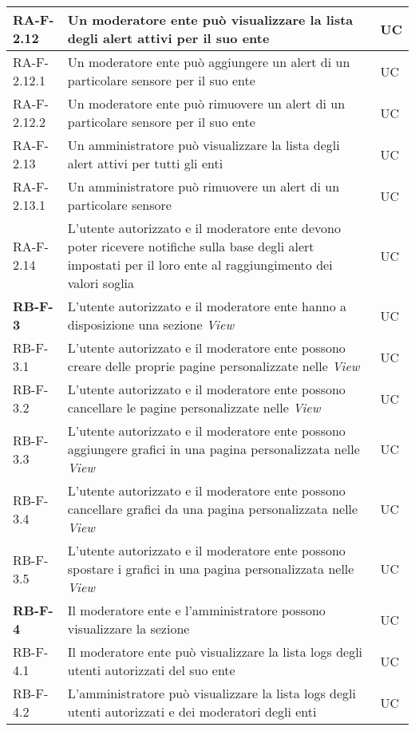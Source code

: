\begin{center}
\begin{longtable}{|p{3cm}|p{9.85cm}|p{2cm}|}
		{\color{gray} RA-F-}2.12 & Un moderatore ente può visualizzare la lista degli alert attivi per il suo ente & UC \\ \hline
		{\color{gray} RA-F-}2.12.1 & Un moderatore ente può aggiungere un alert di un particolare sensore per il suo ente & UC \\ \hline
		{\color{gray} RA-F-}2.12.2 & Un moderatore ente può rimuovere un alert di un particolare sensore per il suo ente & UC \\ \hline
		{\color{gray} RA-F-}2.13 & Un amministratore può visualizzare la lista degli alert attivi per tutti gli enti & UC \\ \hline
		{\color{gray} RA-F-}2.13.1 & Un amministratore può rimuovere un alert di un particolare sensore & UC \\ \hline
		{\color{gray} RA-F-}2.14 & L'utente autorizzato e il moderatore ente devono poter ricevere notifiche sulla base degli alert impostati per il loro ente al raggiungimento dei valori soglia & UC \\ \hline

		\rowcolor{redroundrobin}
		\textbf{RB-F-3} & L'utente autorizzato e il moderatore ente hanno a disposizione una sezione \textit{View} & UC \\ \hline
		{\color{gray} RB-F-}3.1 & L'utente autorizzato e il moderatore ente possono creare delle proprie pagine personalizzate nelle \textit{View} & UC \\ \hline
		{\color{gray} RB-F-}3.2 & L'utente autorizzato e il moderatore ente possono cancellare le pagine personalizzate nelle \textit{View} & UC \\ \hline
		{\color{gray} RB-F-}3.3 & L'utente autorizzato e il moderatore ente possono aggiungere grafici in una pagina personalizzata nelle \textit{View} & UC \\ \hline
		{\color{gray} RB-F-}3.4 & L'utente autorizzato e il moderatore ente possono cancellare grafici da una pagina personalizzata nelle \textit{View} & UC \\ \hline
		{\color{gray} RB-F-}3.5 & L'utente autorizzato e il moderatore ente possono spostare i grafici in una pagina personalizzata nelle \textit{View} & UC \\ \hline

		\rowcolor{redroundrobin}
		\textbf{RB-F-4} & Il moderatore ente e l'amministratore possono visualizzare la sezione \glock{Logs} & UC \\ \hline
		{\color{gray} RB-F-}4.1 & Il moderatore ente può visualizzare la lista logs degli utenti autorizzati del suo ente & UC \\ \hline
		{\color{gray} RB-F-}4.2 & L'amministratore può visualizzare la lista logs degli utenti autorizzati e dei moderatori degli enti & UC \\ \hline


\end{longtable}
\end{center}
